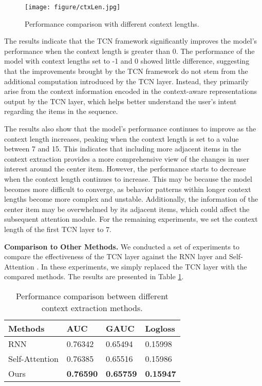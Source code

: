 \begin{figure}
    \centering
    \texttt{[image: figure/ctxLen.jpg]}
    \caption{Performance comparison with different context lengths. }
    \label{fig:contextLength}
    \vspace{-0.5cm}
\end{figure}

The results indicate that the TCN framework significantly improves the model's performance when the context length is greater than 0. The performance of the model with context lengths set to -1 and 0 showed little difference, suggesting that the improvements brought by the TCN framework do not stem from the additional computation introduced by the TCN layer. Instead, they primarily arise from the context information encoded in the context-aware representations output by the TCN layer, which helps better understand the user's intent regarding the items in the sequence.

The results also show that the model's performance continues to improve as the context length increases, peaking when the context length is set to a value between 7 and 15. This indicates that including more adjacent items in the context extraction provides a more comprehensive view of the changes in user interest around the center item. However, the performance starts to decrease when the context length continues to increase. This may be because the model becomes more difficult to converge, as behavior patterns within longer context lengths become more complex and unstable. Additionally, the information of the center item may be overwhelmed by its adjacent items, which could affect the subsequent attention module. For the remaining experiments, we set the context length of the first TCN layer to 7. 

\textbf{Comparison to Other Methods.} We conducted a set of experiments to compare the effectiveness of the TCN layer against the RNN layer \cite{hochreiter1997long,chung2014empirical} and Self-Attention \cite{vaswani2017attention}. In these experiments, we simply replaced the TCN layer with the compared methods. The results are presented in Table \ref{tab:ctxmethod}. 

\begin{table}[!htbp]
\center
\vspace{-0.3cm}
\caption{Performance comparison between different context extraction methods.}
\begin{tabular}{l|lll}
  \toprule
  Methods & AUC  & GAUC  & Logloss  \\ 
  \midrule
  RNN    & 0.76342  & 0.65494 & 0.15998 \\
  Self-Attention  & 0.76385     & 0.65516   & 0.15986 \\
  Ours & \textbf{0.76590} & \textbf{0.65759} & \textbf{0.15947} \\
  \bottomrule
\end{tabular}
\label{tab:ctxmethod}
\vspace{-0.3cm}
\end{table}

